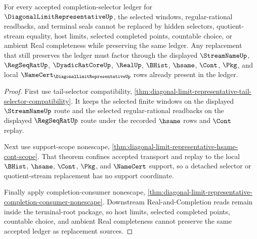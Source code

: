 \begin{theorem}
\label{thm:diagonal-limit-representative-selector-source-nonescape}
For every accepted completion-selector ledger for $\DiagonalLimitRepresentativeUp$, the selected windows, regular-rational readbacks, and terminal seals cannot be replaced by hidden selectors, quotient-stream equality, host limits, selected completed points, countable choice, or ambient Real completeness while preserving the same ledger. Any replacement that still preserves the ledger must factor through the displayed $\StreamNameUp$, $\RegSeqRatUp$, $\DyadicRatCoreUp$, $\RealUp$, $\BHist$, $\hsame$, $\Cont$, $\Pkg$, and local $\NameCert_{\DiagonalLimitRepresentativeUp}$ rows already present in the ledger.
\end{theorem}
\begin{proof}
First use tail-selector compatibility, \autoref{thm:diagonal-limit-representative-tail-selector-compatibility}. It keeps the selected finite windows on the displayed $\StreamNameUp$ route and the selected regular-rational readbacks on the displayed $\RegSeqRatUp$ route under the recorded $\hsame$ rows and $\Cont$ replay.

Next use support-scope nonescape, \autoref{thm:diagonal-limit-representative-hsame-cont-scope}. That theorem confines accepted transport and replay to the local $\BHist$, $\hsame$, $\Cont$, $\Pkg$, and $\NameCert$ support, so a detached selector or quotient-stream replacement has no support coordinate.

Finally apply completion-consumer nonescape, \autoref{thm:diagonal-limit-representative-completion-consumer-nonescape}. Downstream Real-and-Completion reads remain inside the terminal-root package, so host limits, selected completed points, countable choice, and ambient Real completeness cannot preserve the same accepted ledger as replacement sources.
\end{proof}

